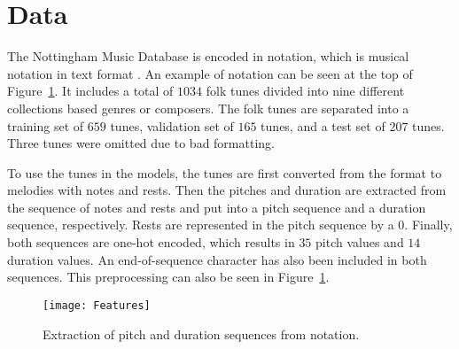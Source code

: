 \section{Data}
\label{sec:data}

The Nottingham Music Database \cite{NMD} is encoded in \ABC notation, which is musical notation in text format \cite{ABC}.
An example of \ABC notation can be seen at the top of Figure~\ref{fig:data:features}.
It includes a total of $1034$ folk tunes divided into nine different collections based genres or composers.
The folk tunes are separated into a training set of $659$ tunes, validation set of $165$ tunes, and a test set of $207$ tunes. Three tunes were omitted due to bad formatting.

To use the tunes in the models,
the tunes are first converted from the \ABC format to melodies with notes and rests.
Then the pitches and duration are extracted from the sequence of notes and rests and put into a pitch sequence and a duration sequence, respectively.
Rests are represented in the pitch sequence by a $0$.
Finally, both sequences are one-hot encoded, which results in $35$ pitch values and $14$ duration values.
An end-of-sequence character has also been included in both sequences.
This preprocessing can also be seen in Figure~\ref{fig:data:features}.

\begin{figure}
	\centering
	\texttt{[image: Features]}
	\caption{Extraction of pitch and duration sequences from \ABC notation.}
	\label{fig:data:features}
\end{figure}
